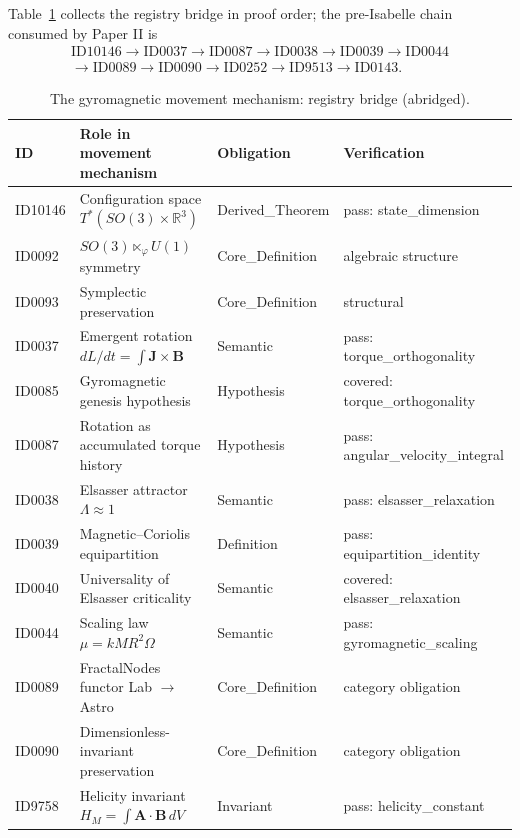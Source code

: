 \documentclass[11pt]{article}
\theoremstyle{remark}
\begin{document}
Table~\ref{tab:spine} collects the registry bridge in proof order; the pre-Isabelle chain consumed by Paper II is
\begin{equation*}
\begin{gathered}
\text{ID10146} \to \text{ID0037} \to \text{ID0087} \to \text{ID0038} \to \text{ID0039} \to \text{ID0044} \\
\to \text{ID0089} \to \text{ID0090} \to \text{ID0252} \to \text{ID9513} \to \text{ID0143}.
\end{gathered}
\end{equation*}

\begin{table}[ht]
\centering
\small
\caption{The gyromagnetic movement mechanism: registry bridge (abridged).}
\label{tab:spine}
\begin{tabular}{llll}
\toprule
ID & Role in movement mechanism & Obligation & Verification \\
\midrule
ID10146 & Configuration space $T^*(SO(3) \times \mathbb{R}^3)$ & Derived\_Theorem & pass: state\_dimension \\
ID0092 & $SO(3) \ltimes_\varphi U(1)$ symmetry & Core\_Definition & algebraic structure \\
ID0093 & Symplectic preservation & Core\_Definition & structural \\
ID0037 & Emergent rotation $dL/dt = \int \mathbf{J} \times \mathbf{B}$ & Semantic & pass: torque\_orthogonality \\
ID0085 & Gyromagnetic genesis hypothesis & Hypothesis & covered: torque\_orthogonality \\
ID0087 & Rotation as accumulated torque history & Hypothesis & pass: angular\_velocity\_integral \\
ID0038 & Elsasser attractor $\Lambda \approx 1$ & Semantic & pass: elsasser\_relaxation \\
ID0039 & Magnetic--Coriolis equipartition & Definition & pass: equipartition\_identity \\
ID0040 & Universality of Elsasser criticality & Semantic & covered: elsasser\_relaxation \\
ID0044 & Scaling law $\mu = kMR^2\Omega$ & Semantic & pass: gyromagnetic\_scaling \\
ID0089 & FractalNodes functor Lab $\to$ Astro & Core\_Definition & category obligation \\
ID0090 & Dimensionless-invariant preservation & Core\_Definition & category obligation \\
ID9758 & Helicity invariant $H_M = \int \mathbf{A} \cdot \mathbf{B}\, dV$ & Invariant & pass: helicity\_constant \\

\end{tabular}
\end{table}
\end{document}
